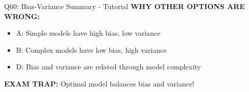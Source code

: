 \documentclass[8pt]{beamer}
\begin{document}
\begin{frame}{Q60: Bias-Variance Summary - Tutorial}
		\vspace{0.05cm}
		\textcolor{myred}{\textbf{WHY OTHER OPTIONS ARE WRONG:}}
		\begin{itemize}
			\item \textcolor{myred}{A:} Simple models have high bias, low variance
			\item \textcolor{myred}{B:} Complex models have low bias, high variance
			\item \textcolor{myred}{D:} Bias and variance are related through model complexity
		\end{itemize}
		
		\textcolor{myred}{\textbf{EXAM TRAP:}} Optimal model balances bias and variance!
	\end{frame}
	
	
\end{document}
